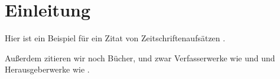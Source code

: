 \documentclass{article}
\begin{document}
\section{Einleitung}
Hier ist ein Beispiel für ein Zitat von Zeitschriftenaufsätzen \parencite{martin1991}.

Außerdem zitieren wir noch Bücher, und zwar Verfasserwerke wie \cite{spiro1977} und \cite{burck1988}
und Herausgeberwerke wie \cite{goust1990}.

\printbibliography
\end{document}
